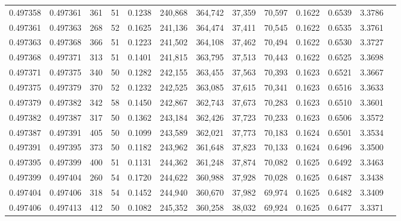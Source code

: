 \begin{tabular}{rrrrrrrrrrrrr}
0.497358 & 0.497361 & 361 &  51 &                                     0.1238 & 240,868 & 364,742 &  37,359 &  70,597 & 0.1622 & 0.6539 & 3.3786 \\
0.497361 & 0.497363 & 268 &  52 &                                     0.1625 & 241,136 & 364,474 &  37,411 &  70,545 & 0.1622 & 0.6535 & 3.3761 \\
0.497363 & 0.497368 & 366 &  51 &                                     0.1223 & 241,502 & 364,108 &  37,462 &  70,494 & 0.1622 & 0.6530 & 3.3727 \\
0.497368 & 0.497371 & 313 &  51 &                                     0.1401 & 241,815 & 363,795 &  37,513 &  70,443 & 0.1622 & 0.6525 & 3.3698 \\
0.497371 & 0.497375 & 340 &  50 &                                     0.1282 & 242,155 & 363,455 &  37,563 &  70,393 & 0.1623 & 0.6521 & 3.3667 \\
0.497375 & 0.497379 & 370 &  52 &                                     0.1232 & 242,525 & 363,085 &  37,615 &  70,341 & 0.1623 & 0.6516 & 3.3633 \\
0.497379 & 0.497382 & 342 &  58 &                                     0.1450 & 242,867 & 362,743 &  37,673 &  70,283 & 0.1623 & 0.6510 & 3.3601 \\
0.497382 & 0.497387 & 317 &  50 &                                     0.1362 & 243,184 & 362,426 &  37,723 &  70,233 & 0.1623 & 0.6506 & 3.3572 \\
0.497387 & 0.497391 & 405 &  50 &                                     0.1099 & 243,589 & 362,021 &  37,773 &  70,183 & 0.1624 & 0.6501 & 3.3534 \\
0.497391 & 0.497395 & 373 &  50 &                                     0.1182 & 243,962 & 361,648 &  37,823 &  70,133 & 0.1624 & 0.6496 & 3.3500 \\
0.497395 & 0.497399 & 400 &  51 &                                     0.1131 & 244,362 & 361,248 &  37,874 &  70,082 & 0.1625 & 0.6492 & 3.3463 \\
0.497399 & 0.497404 & 260 &  54 &                                     0.1720 & 244,622 & 360,988 &  37,928 &  70,028 & 0.1625 & 0.6487 & 3.3438 \\
0.497404 & 0.497406 & 318 &  54 &                                     0.1452 & 244,940 & 360,670 &  37,982 &  69,974 & 0.1625 & 0.6482 & 3.3409 \\
0.497406 & 0.497413 & 412 &  50 &                                     0.1082 & 245,352 & 360,258 &  38,032 &  69,924 & 0.1625 & 0.6477 & 3.3371 \\

\end{tabular}

